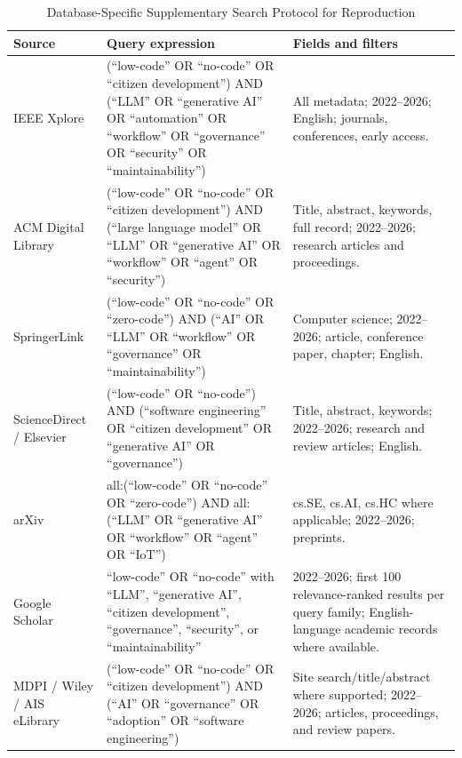 \documentclass[conference]{IEEEtran}
\begin{document}
\begin{table}[t]
\centering
\caption{Database-Specific Supplementary Search Protocol for Reproduction}
\label{tab:dbqueries}
\scriptsize
\begin{tabularx}{\textwidth}{p{} p{} p{}}
\toprule
Source & Query expression & Fields and filters \\
\midrule
IEEE Xplore & (``low-code'' OR ``no-code'' OR ``citizen development'') AND (``LLM'' OR ``generative AI'' OR ``automation'' OR ``workflow'' OR ``governance'' OR ``security'' OR ``maintainability'') & All metadata; 2022--2026; English; journals, conferences, early access. \\
ACM Digital Library & (``low-code'' OR ``no-code'' OR ``citizen development'') AND (``large language model'' OR ``LLM'' OR ``generative AI'' OR ``workflow'' OR ``agent'' OR ``security'') & Title, abstract, keywords, full record; 2022--2026; research articles and proceedings. \\
SpringerLink & (``low-code'' OR ``no-code'' OR ``zero-code'') AND (``AI'' OR ``LLM'' OR ``workflow'' OR ``governance'' OR ``maintainability'') & Computer science; 2022--2026; article, conference paper, chapter; English. \\
ScienceDirect / Elsevier & (``low-code'' OR ``no-code'') AND (``software engineering'' OR ``citizen development'' OR ``generative AI'' OR ``governance'') & Title, abstract, keywords; 2022--2026; research and review articles; English. \\
arXiv & all:(``low-code'' OR ``no-code'' OR ``zero-code'') AND all:(``LLM'' OR ``generative AI'' OR ``workflow'' OR ``agent'' OR ``IoT'') & cs.SE, cs.AI, cs.HC where applicable; 2022--2026; preprints. \\
Google Scholar & ``low-code'' OR ``no-code'' with ``LLM'', ``generative AI'', ``citizen development'', ``governance'', ``security'', or ``maintainability'' & 2022--2026; first 100 relevance-ranked results per query family; English-language academic records where available. \\
MDPI / Wiley / AIS eLibrary & (``low-code'' OR ``no-code'' OR ``citizen development'') AND (``AI'' OR ``governance'' OR ``adoption'' OR ``software engineering'') & Site search/title/abstract where supported; 2022--2026; articles, proceedings, and review papers. \\
\bottomrule
\end{tabularx}
\end{table}
\end{document}
